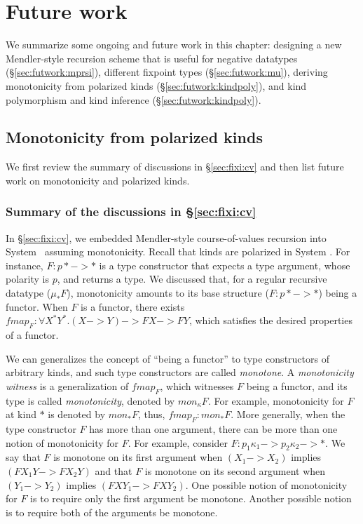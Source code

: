 \chapter{Future work}\label{ch:futwork}
We summarize some ongoing and future work in this chapter:
designing a new Mendler-style recursion scheme that is
useful for negative datatypes (\S\ref{sec:futwork:mprsi}),
different fixpoint types (\S\ref{sec:futwork:mu}),
deriving monotonicity from polarized kinds (\S\ref{sec:futwork:kindpoly}), and
kind polymorphism and kind inference (\S\ref{sec:futwork:kindpoly}).



\section{Monotonicity from polarized kinds}\label{sec:futwork:mon}
We first review the summary of discussions in \S\ref{sec:fixi:cv}
and then list future work on monotonicity and polarized kinds.

\subsection*{Summary of the discussions in \S\ref{sec:fixi:cv}}
In \S\ref{sec:fixi:cv}, we embedded Mendler-style course-of-values recursion
into System \Fixi\ assuming monotonicity. Recall that kinds are polarized in
System \Fixi. For instance, $F: p* -> *$ is a type constructor that expects
a type argument, whose polarity is $p$, and returns a type. We discussed that,
for a regular recursive datatype ($\mu_{*} F$), monotonicity amounts to
its base structure ($F:p* -> *$) being a functor. When $F$ is a functor,
there exists $\textit{fmap}_F : \forall X^{*} Y^{*}. (X -> Y) -> F X -> F Y$,
which satisfies the desired properties of a functor.

We can generalizes the concept of ``being a functor''
to type constructors of arbitrary kinds, and such
type constructors are called \emph{monotone}.
A \emph{monotonicity witness} is a generalization of $\textit{fmap}_F$,
which witnesses $F$ being a functor, and its type is called \emph{monotonicity},
denoted by $\textit{mon}_{\kappa}F$. For example, monotonicity for $F$
at kind $*$ is denoted by $mon_{*}F$, thus, $\textit{fmap}_F : mon_{*} F$.
More generally, when the type constructor $F$ has more than one argument,
there can be more than one notion of monotonicity for $F$.
For example, consider $F : p_1\kappa_1 -> p_2\kappa_2 -> *$.
We say that $F$ is monotone on its first argument
when $(X_1 -> X_2)$ implies $(F X_1 Y -> F X_2 Y)$ and
that $F$ is monotone on its second argument
when $(Y_1 -> Y_2)$ implies $(F X Y_1 -> F X Y_2)$.
One possible notion of monotonicity for $F$ is to require only the first
argument be monotone. Another possible notion is to require both of
the arguments be monotone.

